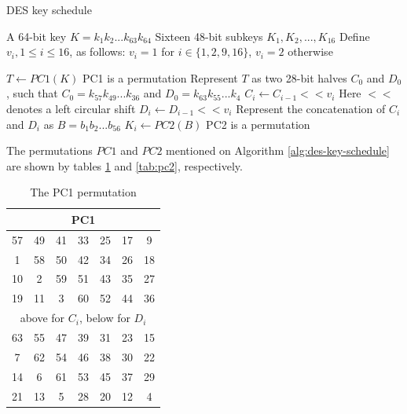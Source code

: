 \documentclass{report}
\begin{document}
\begin{algorithm}[H]
\caption{DES key schedule}
\label{alg:des-key-schedule}
\begin{algorithmic}[1]
    \Require A 64-bit key $K = k_1k_2...k_{63}k_{64}$
    \Ensure Sixteen 48-bit subkeys $K_1, K_2, ..., K_{16}$
    \State Define $v_i, 1 \leq i \leq 16$, as follows: $v_i = 1$ for $i \in \{1, 2, 9, 16\}$, $v_i = 2$ otherwise
    
    \State $T \gets PC1(K)$
    \Comment PC1 is a permutation
    \State Represent $T$ as two 28-bit halves $C_0$ and $D_0$, such that $C_0 = k_{57}k_{49}...k_{36}$ and $D_0 = k_{63}k_{55}...k_{4}$
        \State $C_i \gets C_{i-1} << v_i$
        \Comment Here $<<$ denotes a left circular shift
        \State $D_i \gets D_{i-1} << v_i$
        \State Represent the concatenation of $C_i$ and $D_i$ as $B = b_1b_2...b_{56}$
        \State $K_i \gets PC2(B)$
        \Comment PC2 is a permutation
    \EndFor

\end{algorithmic}
\end{algorithm}

The permutations $PC1$ and $PC2$ mentioned on Algorithm \ref{alg:des-key-schedule} are shown by tables \ref{tab:pc1} and \ref{tab:pc2}, respectively.

\begin{table}[H]
\centering
\begin{tabular}{|c|c|c|c|c|c|c|}
\hline
\multicolumn{7}{|c|}{PC1}                                         \\ \hline
57      & 49      & 41      & 33      & 25      & 17     & 9      \\ \hline
1       & 58      & 50      & 42      & 34      & 26     & 18     \\ \hline
10      & 2       & 59      & 51      & 43      & 35     & 27     \\ \hline
19      & 11      & 3       & 60      & 52      & 44     & 36     \\ \hline
\multicolumn{7}{|c|}{above for $C_i$, below for $D_i$} \\ \hline
63      & 55      & 47      & 39      & 31      & 23     & 15     \\ \hline
7       & 62      & 54      & 46      & 38      & 30     & 22     \\ \hline
14      & 6       & 61      & 53      & 45      & 37     & 29     \\ \hline
21      & 13      & 5       & 28      & 20      & 12     & 4      \\ \hline
\end{tabular}
\caption{The PC1 permutation}
\label{tab:pc1}
\end{table}
\end{document}
